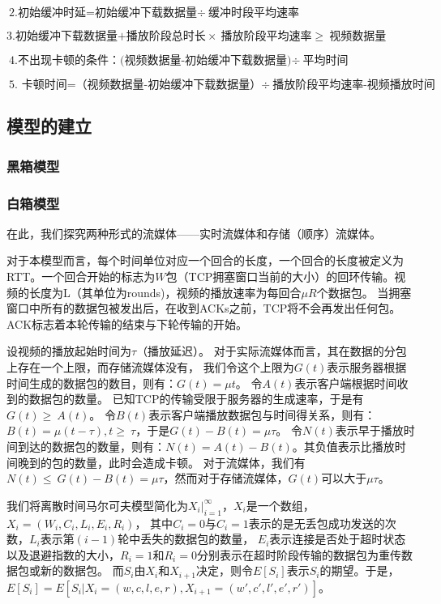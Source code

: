 \documentclass[UTF8]{ctexart}
\begin{document}
$ \text{2.初始缓冲时延=初始缓冲下载数据量} \div\ \text{缓冲时段平均速率} $

$ \text{3.初始缓冲下载数据量+播放阶段总时长} \times\ \text{播放阶段平均速率}\geq\ \text{视频数据量} $

$ \text{4.不出现卡顿的条件：(视频数据量-初始缓冲下载数据量)} \div\ \text{平均时间} $

$ \text{5. 卡顿时间=（视频数据量-初始缓冲下载数据量）}\div\ \text{播放阶段平均速率-视频播放时间} $
\subsection{模型的建立}
\subsubsection{黑箱模型}
\subsubsection{白箱模型}
在此，我们探究两种形式的流媒体——实时流媒体和存储（顺序）流媒体。

对于本模型而言，每个时间单位对应一个回合的长度，一个回合的长度被定义为RTT。一个回合开始的标志为$ W $包（TCP拥塞窗口当前的大小）的回环传输。视频的长度为L（其单位为rounds)，视频的播放速率为每回合$ \mu R $个数据包。
当拥塞窗口中所有的数据包被发出后，在收到ACKs之前，TCP将不会再发出任何包。ACK标志着本轮传输的结束与下轮传输的开始。

设视频的播放起始时间为\( \tau \)（播放延迟）。
对于实际流媒体而言，其在数据的分包上存在一个上限，而存储流媒体没有，
我们令这个上限为\( G(t) \)表示服务器根据时间生成的数据包的数目，则有：\( G(t)= \mu t\)。
令\( A(t) \)表示客户端根据时间收到的数据包的数量。
已知TCP的传输受限于服务器的生成速率，于是有\( G(t)\geq\ A(t)\)。
令\(B(t)\)表示客户端播放数据包与时间得关系，则有：\( B(t)=\mu(t-\tau),t\geq\ \tau \)，于是\(G(t)-B(t)=\mu \tau \)。
令$ N(t) $表示早于播放时间到达的数据包的数量，则有：$ N(t)=A(t)-B(t)$。其负值表示比播放时间晚到的包的数量，此时会造成卡顿。
对于流媒体，我们有$ N(t)\leq\ G(t)-B(t)=\mu \tau $，然而对于存储流媒体，$ G(t)$可以大于$ \mu \tau$。

我们将离散时间马尔可夫模型简化为$ X_i|_{i=1}^\infty $，$ X_i $是一个数组，$ X_i=(W_i,C_i,L_i,E_i,R_i) $，
其中$ C_i=0 $与$ C_i=1 $表示的是无丢包成功发送的次数，$ L_i $表示第$(i-1)$轮中丢失的数据包的数量，
$ E_i $表示连接是否处于超时状态以及退避指数的大小，$ R_i=1 $和$ R_i=0 $分别表示在超时阶段传输的数据包为重传数据包或新的数据包。
而$ S_i $由$ X_i $和$ X_{i+1} $决定，则令$ E[S_i] $表示$ S_i $的期望。于是，$ E[S_i]=E[S_i|X_i=(w,c,l,e,r),X_{i+1}=(w',c',l',e',r')] $。
\end{document}
